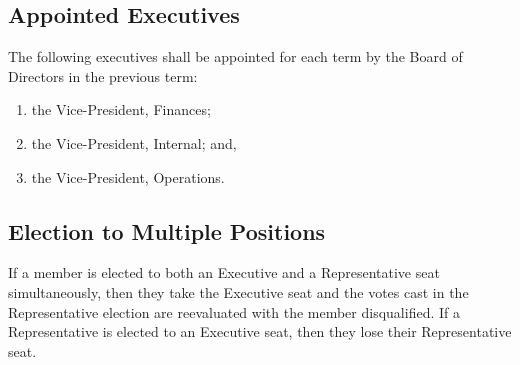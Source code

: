 \subsection{Appointed Executives}
The following executives shall be appointed for each term by the Board
of Directors in the previous term:
\begin{enumerate} 
    \item the Vice-President, Finances;
    \item the Vice-President, Internal; and,
    \item the Vice-President, Operations.
\end{enumerate}

\subsection{Election to Multiple Positions}
If a member is elected to both an Executive and a Representative seat
simultaneously, then they take the Executive seat and the votes cast in the
Representative election are reevaluated with the member disqualified. If a
Representative is elected to an Executive seat, then they lose their
Representative seat.
